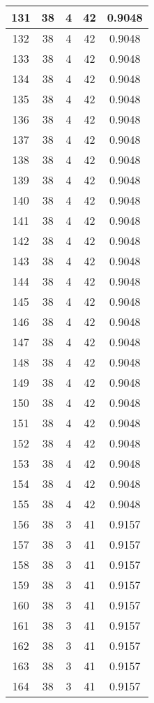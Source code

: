\documentclass[letterpaper, 12pt]{article}
\begin{document}
\begin{longtable}{|c|c|c|c|c|}
\hline
131 & 38 & 4 & 42 & 0.9048 \\
\hline
132 & 38 & 4 & 42 & 0.9048 \\
\hline
133 & 38 & 4 & 42 & 0.9048 \\
\hline
134 & 38 & 4 & 42 & 0.9048 \\
\hline
135 & 38 & 4 & 42 & 0.9048 \\
\hline
136 & 38 & 4 & 42 & 0.9048 \\
\hline
137 & 38 & 4 & 42 & 0.9048 \\
\hline
138 & 38 & 4 & 42 & 0.9048 \\
\hline
139 & 38 & 4 & 42 & 0.9048 \\
\hline
140 & 38 & 4 & 42 & 0.9048 \\
\hline
141 & 38 & 4 & 42 & 0.9048 \\
\hline
142 & 38 & 4 & 42 & 0.9048 \\
\hline
143 & 38 & 4 & 42 & 0.9048 \\
\hline
144 & 38 & 4 & 42 & 0.9048 \\
\hline
145 & 38 & 4 & 42 & 0.9048 \\
\hline
146 & 38 & 4 & 42 & 0.9048 \\
\hline
147 & 38 & 4 & 42 & 0.9048 \\
\hline
148 & 38 & 4 & 42 & 0.9048 \\
\hline
149 & 38 & 4 & 42 & 0.9048 \\
\hline
150 & 38 & 4 & 42 & 0.9048 \\
\hline
151 & 38 & 4 & 42 & 0.9048 \\
\hline
152 & 38 & 4 & 42 & 0.9048 \\
\hline
153 & 38 & 4 & 42 & 0.9048 \\
\hline
154 & 38 & 4 & 42 & 0.9048 \\
\hline
155 & 38 & 4 & 42 & 0.9048 \\
\hline
156 & 38 & 3 & 41 & 0.9157 \\
\hline
157 & 38 & 3 & 41 & 0.9157 \\
\hline
158 & 38 & 3 & 41 & 0.9157 \\
\hline
159 & 38 & 3 & 41 & 0.9157 \\
\hline
160 & 38 & 3 & 41 & 0.9157 \\
\hline
161 & 38 & 3 & 41 & 0.9157 \\
\hline
162 & 38 & 3 & 41 & 0.9157 \\
\hline
163 & 38 & 3 & 41 & 0.9157 \\
\hline
164 & 38 & 3 & 41 & 0.9157 \\

\end{longtable}
\end{document}

